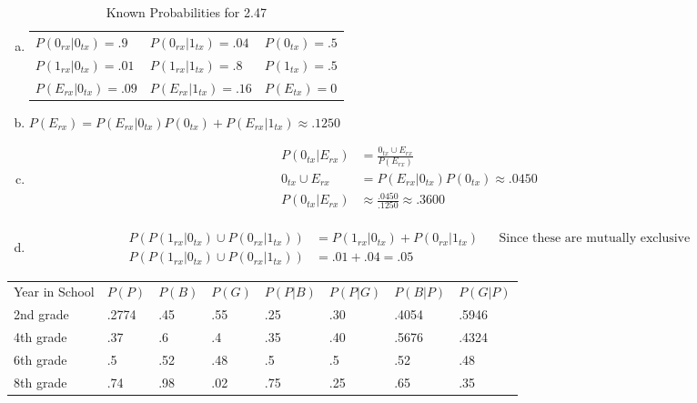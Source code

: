 \documentclass[12pt]{article}
\newenvironment{problem}[2][Problem]{\begin{trivlist}
\item[\hskip \labelsep {\bfseries #1}\hskip \labelsep {\bfseries #2.}]
  \vspace{1 cm}
}{\end{trivlist}}
\begin{document}
\begin{problem}{2.47}
\item
  \begin{enumerate}[a.]
    \item %
      \begin{table}[!htpb]
        \centering
          \caption{Known Probabilities for 2.47}
          \label{probs_2_4}
            \begin{tabular}{lll}
              $P(0_{rx}|0_{tx}) = .9$  & $P(0_{rx}|1_{tx}) = .04$ & $P(0_{tx}) = .5$ \\
              $P(1_{rx}|0_{tx}) = .01$ & $P(1_{rx}|1_{tx}) = .8$  & $P(1_{tx}) = .5$ \\
              $P(E_{rx}|0_{tx}) = .09$ & $P(E_{rx}|1_{tx}) = .16$ & $P(E_{tx}) = 0$ 
            \end{tabular}
      \end{table}
    \item %
      $P(E_{rx}) = P(E_{rx}|0_{tx})P(0_{tx}) + P(E_{rx}|1_{tx}) \approx .1250$
    \item %
      \begin{align*}
        P(0_{tx}|E_{rx}) &= \frac{0_{tx} \cup E_{rx}}{P(E_{rx})} \\
        0_{tx} \cup E_{rx} &= P(E_{rx}|0_{tx})P(0_{tx}) \approx .0450 \\
        P(0_{tx}|E_{rx}) &\approx \frac{.0450}{.1250} \approx .3600 \\
      \end{align*}
    \item %
      \begin{align*}
        P(P(1_{rx}|0_{tx})\cup P(0_{rx}|1_{tx})) &= P(1_{rx}|0_{tx}) + P(0_{rx}|1_{tx}) & & \textrm{Since these are mutually exclusive} \\
        P(P(1_{rx}|0_{tx})\cup P(0_{rx}|1_{tx})) &= .01 + .04 = .05 
      \end{align*}
  \end{enumerate}
\end{problem}

\begin{problem}{2.49}
\item
  \begin{table}[!htbp]
    \centering
    \begin{tabular}{llllllll}
      Year in School & $P(P)$ & $P(B)$ & $P(G)$ & $P(P|B)$ & $P(P|G)$ & $P(B|P)$ & $P(G|P)$ \\
      2nd grade      & .2774  & .45    & .55    & .25      & .30      & .4054    & .5946    \\
      4th grade      & .37    & .6     & .4     & .35      & .40      & .5676    & .4324    \\
      6th grade      & .5     & .52    & .48    & .5       & .5       & .52      & .48      \\
      8th grade      & .74    & .98    & .02    & .75      & .25      & .65      & .35     
    \end{tabular}
  \end{table}
\end{problem}
\end{document}
